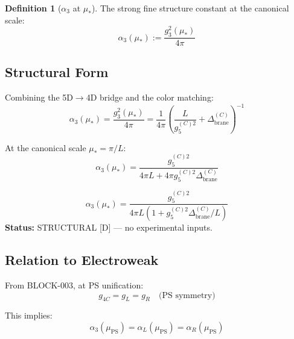 \documentclass[11pt,a4paper]{article}
\theoremstyle{definition}
\newtheorem{definition}{Definition}[section]
\begin{document}
\begin{definition}[$\alpha_3$ at $\mu_*$]
\label{def:alpha3}
The strong fine structure constant at the canonical scale:
\begin{equation}
  \label{eq:alpha3-def}
  \boxed{\alpha_3(\mu_*) := \frac{g_3^2(\mu_*)}{4\pi}}
\end{equation}
\end{definition}

\subsection{Structural Form}
\label{subsec:structural-form}

Combining the 5D$\to$4D bridge and the color matching:
\begin{equation}
  \label{eq:alpha3-structural}
  \alpha_3(\mu_*) = \frac{g_3^2(\mu_*)}{4\pi}
  = \frac{1}{4\pi} \left( \frac{L}{g_5^{(C)2}} + \Delta_{\text{brane}}^{(C)} \right)^{-1}
\end{equation}

At the canonical scale $\mu_* = \pi/L$:
\begin{equation}
  \label{eq:alpha3-at-mustar}
  \alpha_3(\mu_*) = \frac{g_5^{(C)2}}{4\pi L + 4\pi g_5^{(C)2} \Delta_{\text{brane}}^{(C)}}
\end{equation}

\begin{predictionbox}
\begin{equation}
  \label{eq:alpha3-final}
  \boxed{\alpha_3(\mu_*) = \frac{g_5^{(C)2}}{4\pi L \left(1 + g_5^{(C)2} \Delta_{\text{brane}}^{(C)}/L\right)}}
\end{equation}
\textbf{Status:} STRUCTURAL [D] — no experimental inputs.
\end{predictionbox}

\subsection{Relation to Electroweak}
\label{subsec:relation-ew}

From BLOCK-003, at PS unification:
\begin{equation}
  \label{eq:ps-unification}
  g_{4C} = g_L = g_R \quad \text{(PS symmetry)}
\end{equation}

This implies:
\begin{equation}
  \label{eq:alpha-unification}
  \alpha_3(\mu_{\text{PS}}) = \alpha_L(\mu_{\text{PS}}) = \alpha_R(\mu_{\text{PS}})
\end{equation}
\end{document}
